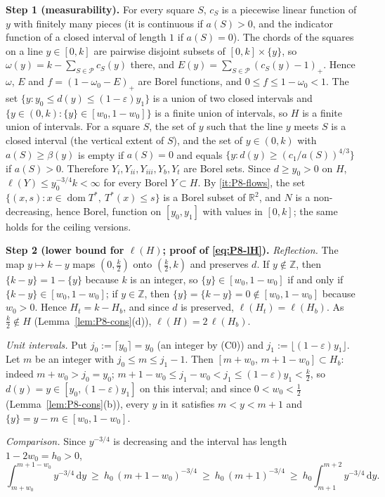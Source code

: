 \documentclass[11pt]{amsart}
\newcommand{\R}{\mathbb R}
\newcommand{\Z}{\mathbb Z}
\newcommand{\eps}{\varepsilon}
\newcommand{\cP}{\mathcal P}
\newcommand{\Tstar}{T^{*}}
\newcommand{\frc}[1]{\{#1\}}
\newcommand{\dd}{\,\mathrm d}
\theoremstyle{definition}
\theoremstyle{remark}
\numberwithin{equation}{section}
\begin{document}
\medskip\noindent\textbf{Step 1 (measurability).}
For every square $S$, $c_S$ is a piecewise linear function of $y$ with finitely many pieces (it is continuous if
$a(S)>0$, and the indicator function of a closed interval of length $1$ if $a(S)=0$). The chords of the squares on a
line $y\in[0,k]$ are pairwise disjoint subsets of $[0,k]\times\{y\}$, so $\omega(y)=k-\sum_{S\in\cP}c_S(y)$ there, and
$E(y)=\sum_{S\in\cP}(c_S(y)-1)_+$. Hence $\omega$, $E$ and $f=(1-\omega_0-E)_+$ are Borel functions, and
$0\le f\le1-\omega_0<1$. The set $\{y:y_0\le d(y)\le(1-\eps)y_1\}$ is a union of two closed intervals and
$\{y\in(0,k):\frc{y}\in[w_0,1-w_0]\}$ is a finite union of intervals, so $H$ is a finite union of intervals. For a
square $S$, the set of $y$ such that the line $y$ meets $S$ is a closed interval (the vertical extent of $S$), and the
set of $y\in(0,k)$ with $a(S)\ge\beta(y)$ is empty if $a(S)=0$ and equals $\{y:d(y)\ge(c_1/a(S))^{4/3}\}$ if $a(S)>0$.
Therefore $Y_i,Y_{ii},Y_{iii},Y_b,Y_t$ are Borel sets. Since $d\ge y_0>0$ on $H$, $\ell(Y)\le y_0^{-3/4}k<\infty$ for
every Borel $Y\subset H$. By \ref{it:P8-flows}, the set $\{(x,s):x\in\operatorname{dom}\Tstar,\ \Tstar(x)\le s\}$ is a
Borel subset of $\R^2$, and $N$ is a non-decreasing, hence Borel, function on $[y_0,y_1]$ with values in $[0,k]$; the
same holds for the ceiling versions.

\medskip\noindent\textbf{Step 2 (lower bound for $\ell(H)$; proof of \eqref{eq:P8-lH}).}
\emph{Reflection.} The map $y\mapsto k-y$ maps $(0,\frac k2)$ onto $(\frac k2,k)$ and preserves $d$. If $y\notin\Z$,
then $\frc{k-y}=1-\frc{y}$ because $k$ is an integer, so $\frc{y}\in[w_0,1-w_0]$ if and only if
$\frc{k-y}\in[w_0,1-w_0]$; if $y\in\Z$, then $\frc{y}=\frc{k-y}=0\notin[w_0,1-w_0]$ because $w_0>0$. Hence
$H_t=k-H_b$, and since $d$ is preserved, $\ell(H_t)=\ell(H_b)$. As $\frac k2\notin H$
(Lemma~\ref{lem:P8-cons}(d)), $\ell(H)=2\,\ell(H_b)$.

\emph{Unit intervals.} Put $j_0:=\lceil y_0\rceil=y_0$ (an integer by (C0)) and $j_1:=\lfloor(1-\eps)y_1\rfloor$. Let
$m$ be an integer with $j_0\le m\le j_1-1$. Then $[m+w_0,\,m+1-w_0]\subset H_b$: indeed $m+w_0>j_0=y_0$;
$m+1-w_0\le j_1-w_0<j_1\le(1-\eps)y_1<\frac k2$, so $d(y)=y\in[y_0,(1-\eps)y_1]$ on this interval; and since
$0<w_0<\frac12$ (Lemma~\ref{lem:P8-cons}(b)), every $y$ in it satisfies $m<y<m+1$ and $\frc{y}=y-m\in[w_0,1-w_0]$.

\emph{Comparison.} Since $y^{-3/4}$ is decreasing and the interval has length $1-2w_0=h_0>0$,
\[
\int_{m+w_0}^{m+1-w_0}y^{-3/4}\dd y\ \ge\ h_0\,(m+1-w_0)^{-3/4}\ \ge\ h_0\,(m+1)^{-3/4}\ \ge\ h_0\int_{m+1}^{m+2}y^{-3/4}\dd y .
\]
\end{document}
